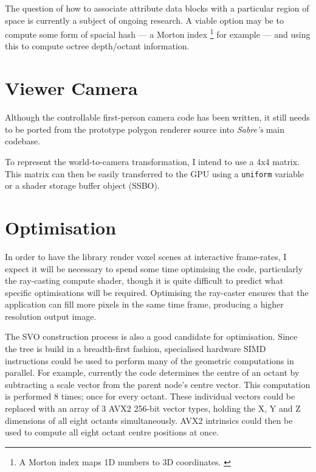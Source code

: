 The question of how to associate attribute data blocks with a particular region of space is currently a subject of ongoing research. A viable option may be to compute some form of spacial hash --- a Morton index \footnote{A Morton index maps 1D numbers to 3D coordinates. \autocite{morton1966computer}} for example --- and using this to compute octree depth/octant information.


\section{Viewer Camera}
Although the controllable first-person camera code has been written, it still needs to be ported from the prototype polygon renderer source into \textit{Sabre's} main codebase.

To represent the world-to-camera transformation, I intend to use a 4x4 matrix. This matrix can then be easily transferred to the GPU using a \texttt{uniform} variable or a shader storage buffer object (SSBO).

\section{Optimisation}
In order to have the library render voxel scenes at interactive frame-rates, I expect it will be necessary to spend some time optimising the code, particularly the ray-casting compute shader, though it is quite difficult to predict what specific optimisations will be required. Optimising the ray-caster ensures that the application can fill more pixels in the same time frame, producing a higher resolution output image.

The SVO construction process is also a good candidate for optimisation. Since the tree is build in a breadth-first fashion, specialised hardware SIMD instructions could be used to perform many of the geometric computations in parallel. For example, currently the code determines the centre of an octant by subtracting a scale vector from the parent node's centre vector. This computation is performed 8 times; once for every octant. These individual vectors could be replaced with an array of 3 AVX2 256-bit vector types, holding the X, Y and Z dimensions of all eight octants simultaneously. AVX2 intrinsics could then be used to compute all eight octant centre positions at once.

